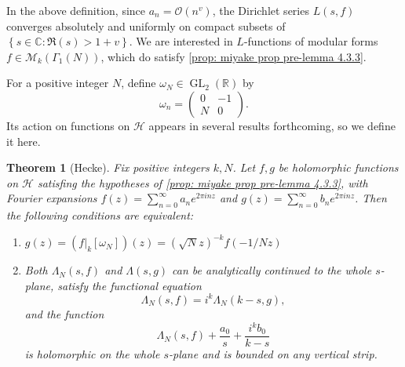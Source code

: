 \documentclass[10pt,leqno,twoside]{article}
\theoremstyle{plain}
\newtheorem{theorem}[lem]{Theorem}
\theoremstyle{definition}
\numberwithin{equation}{section}
\numberwithin{lem}{section}
\newcommand{\cbr}[1]{\left\{#1\right\}}
\newcommand{\textib}[1]{\textbf{\textit{#1\index{#1}}}} %
\DeclareMathOperator{\GL}{GL}
\begin{document}
In the above definition, since $a_n = \mathcal O(n^v)$, the Dirichlet series $L(s,f)$ converges absolutely and uniformly on compact subsets of $\cbr{s\in\mathbb C : \Re(s)>1+v}$. We are interested in $L$-functions of modular forms $f\in\mathcal M_k(\varGamma_1(N))$, which do satisfy \cref{prop: miyake prop pre-lemma 4.3.3}. 

For a positive integer $N$, define \textib{$\omega_N$}$\in\GL_2(\mathbb R)$ by 
\[\omega_n = \begin{pmatrix}
    0 & -1 \\ N & 0
\end{pmatrix}.\]
Its action on functions on $\mathcal H$ appears in several results forthcoming, so we define it here.

\begin{theorem}[Hecke]\label{thm: miyake thm 4.3.6}
    Fix positive integers $k,N$. Let $f,g$ be holomorphic functions on $\mathcal H$ satisfing the hypotheses of \cref{prop: miyake prop pre-lemma 4.3.3}, with Fourier expansions $f(z) = \sum_{n=0}^\infty a_ne^{2\pi i nz}$ and $g(z) = \sum_{n=0}^\infty b_ne^{2\pi i nz}$. Then the following conditions are equivalent: 
    \begin{enumerate}[label = \textup{(\alph*)}]
        \item $g(z) = (f|_k[\omega_N])(z) = (\sqrt{N}z)^{-k}f(-1/Nz)$
        \item Both $\varLambda_N(s,f)$ and $\varLambda(s,g)$ can be analytically continued to the whole $s$-plane, satisfy the functional equation \[\varLambda_N(s,f) = i^k\varLambda_N(k-s,g),\] and the function \[\varLambda_N(s,f) + \frac{a_0}{s} + \frac{i^kb_0}{k-s}\] is holomorphic on the whole $s$-plane and is bounded on any vertical strip.
    \end{enumerate}
\end{theorem}
\end{document}
